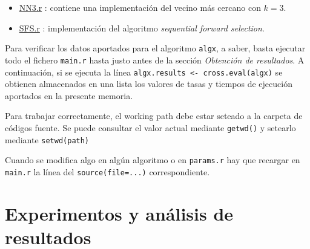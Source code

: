 \documentclass[a4paper,11pt]{article}
\newcommand{\hrefr}[1]{
\href{../bin/#1}{#1}
}
\begin{document}
\begin{itemize}
 \item \hrefr{NN3.r}: contiene una implementación del vecino más cercano con $k=3$.
 \item \hrefr{SFS.r}: implementación del algoritmo \textit{sequential forward selection}.
 \end{itemize}
 
 Para verificar los datos aportados para el algoritmo \texttt{algx}, a saber, basta ejecutar todo el fichero \texttt{main.r}
 hasta justo antes de la sección \textit{Obtención de resultados}. A continuación, si se ejecuta la línea 
 \texttt{algx.results <- cross.eval(algx)} se obtienen almacenados en una lista los valores de tasas y tiempos de ejecución
 aportados en la presente memoria. 
 
 Para trabajar correctamente, el working path debe estar seteado a la carpeta de códigos fuente. Se puede consultar el 
 valor actual mediante \texttt{getwd()} y setearlo mediante \texttt{setwd(path)}
 
 Cuando se modifica algo en algún algoritmo o en \texttt{params.r} hay que recargar en \texttt{main.r}
 la línea del \texttt{source(file=...)} correspondiente.
 
 \section{Experimentos y análisis de resultados}
\end{document}
